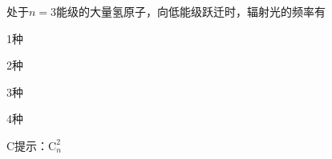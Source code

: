处于\(n = 3\)能级的大量氢原子，向低能级跃迁时，辐射光的频率有\paren[]
\begin{choices}
	\item 1种 
	\item 2种
	\item 3种
	\item 4种
\end{choices}
\begin{answer}
	C\qquad 提示：\(\mathrm{C}^2_n\)
\end{answer}